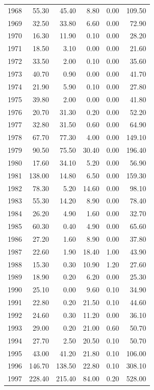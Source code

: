 \documentclass[12pt,]{article}
\begin{document}
\begin{longtable}{rrrrrr}
  1968 & 55.30 & 45.40 & 8.80 & 0.00 & 109.50 \\ 
  1969 & 32.50 & 33.80 & 6.60 & 0.00 & 72.90 \\ 
  1970 & 16.30 & 11.90 & 0.10 & 0.00 & 28.20 \\ 
  1971 & 18.50 & 3.10 & 0.00 & 0.00 & 21.60 \\ 
  1972 & 33.50 & 2.00 & 0.10 & 0.00 & 35.60 \\ 
  1973 & 40.70 & 0.90 & 0.00 & 0.00 & 41.70 \\ 
  1974 & 21.90 & 5.90 & 0.10 & 0.00 & 27.80 \\ 
  1975 & 39.80 & 2.00 & 0.00 & 0.00 & 41.80 \\ 
  1976 & 20.70 & 31.30 & 0.20 & 0.00 & 52.20 \\ 
  1977 & 32.80 & 31.50 & 0.60 & 0.00 & 64.90 \\ 
  1978 & 67.70 & 77.30 & 4.00 & 0.00 & 149.10 \\ 
  1979 & 90.50 & 75.50 & 30.40 & 0.00 & 196.40 \\ 
  1980 & 17.60 & 34.10 & 5.20 & 0.00 & 56.90 \\ 
  1981 & 138.00 & 14.80 & 6.50 & 0.00 & 159.30 \\ 
  1982 & 78.30 & 5.20 & 14.60 & 0.00 & 98.10 \\ 
  1983 & 55.30 & 14.20 & 8.90 & 0.00 & 78.40 \\ 
  1984 & 26.20 & 4.90 & 1.60 & 0.00 & 32.70 \\ 
  1985 & 60.30 & 0.40 & 4.90 & 0.00 & 65.60 \\ 
  1986 & 27.20 & 1.60 & 8.90 & 0.00 & 37.80 \\ 
  1987 & 22.60 & 1.90 & 18.40 & 1.00 & 43.90 \\ 
  1988 & 15.30 & 0.30 & 10.90 & 1.20 & 27.60 \\ 
  1989 & 18.90 & 0.20 & 6.20 & 0.00 & 25.30 \\ 
  1990 & 25.10 & 0.00 & 9.60 & 0.10 & 34.90 \\ 
  1991 & 22.80 & 0.20 & 21.50 & 0.10 & 44.60 \\ 
  1992 & 24.60 & 0.30 & 11.20 & 0.00 & 36.10 \\ 
  1993 & 29.00 & 0.20 & 21.00 & 0.60 & 50.70 \\ 
  1994 & 27.70 & 2.50 & 20.50 & 0.10 & 50.70 \\ 
  1995 & 43.00 & 41.20 & 21.80 & 0.10 & 106.00 \\ 
  1996 & 146.70 & 138.50 & 22.80 & 0.10 & 308.10 \\ 
  1997 & 228.40 & 215.40 & 84.00 & 0.20 & 528.00 \\ 

\end{longtable}
\end{document}
